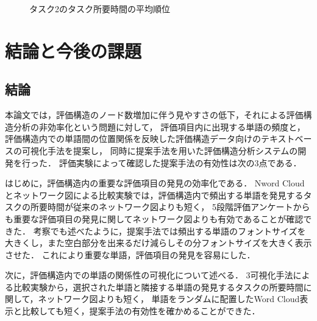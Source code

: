 \documentclass[syuuron]{kuee}
\begin{document}
		\begin{figure}
			\begin{center}
			\end{center}
			\caption{タスク2のタスク所要時間の平均順位}
	  		\label{fig:res10}
		\end{figure}

\chapter{結論と今後の課題}
	\section{結論}
		本論文では，評価構造のノード数増加に伴う見やすさの低下，それによる評価構造分析の非効率化という問題に対して，
		評価項目内に出現する単語の頻度と，評価構造内での単語間の位置関係を反映した評価構造データ向けのテキストベースの可視化手法を提案し，
		同時に提案手法を用いた評価構造分析システムの開発を行った．
		評価実験によって確認した提案手法の有効性は次の3点である．
		
		はじめに，評価構造内の重要な評価項目の発見の効率化である．
		Nword Cloudとネットワーク図による比較実験では，評価構造内で頻出する単語を発見するタスクの所要時間が従来のネットワーク図よりも短く，
		5段階評価アンケートからも重要な評価項目の発見に関してネットワーク図よりも有効であることが確認できた．
		考察でも述べたように，提案手法では頻出する単語のフォントサイズを大きくし，また空白部分を出来るだけ減らしその分フォントサイズを大きく表示させた．
		これにより重要な単語，評価項目の発見を容易にした．
		
		次に，評価構造内での単語の関係性の可視化について述べる．
		3可視化手法による比較実験から，選択された単語と隣接する単語の発見するタスクの所要時間に関して，ネットワーク図よりも短く，
		単語をランダムに配置したWord Cloud表示と比較しても短く，提案手法の有効性を確かめることができた．
		
\end{document}
